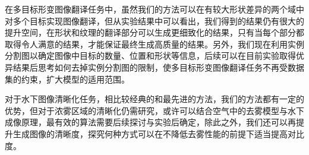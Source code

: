 在多目标形变图像翻译任务中，虽然我们的方法可以在有较大形状差异的两个域中对多个目标实现图像翻译，但从实验结果中可以看出，我们得到的结果仍有很大的提升空间，在形状和纹理的翻译部分可以生成更细致化的结果，只有当每个部分都取得令人满意的结果，才能保证最终生成高质量的结果。另外，我们现在利用实例分割图以确定图像中目标的数量、位置和形状等信息，后续可以在目前实验取得优异结果后思考如何去掉实例分割图的限制，使多目标形变图像翻译任务不再受数据集的约束，扩大模型的适用范围。

对于水下图像清晰化任务，相比较经典的和最先进的方法，我们的方法都有一定的优势，但对于浓雾区域的清晰化仍需研究，或许可以结合空气中的去雾模型与水下成像原理，最有效的算法需要后续探讨与实验后确定，除此之外，我们还可以再提升生成图像的清晰度，探究何种方式可以在不降低去雾性能的前提下适当提高对比度。
